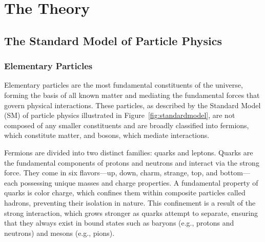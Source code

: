 \chapter{The Theory} \label{chap:chap-2}




    



\section{The Standard Model of Particle Physics}


\subsection{Elementary Particles}

Elementary particles are the most fundamental constituents of the universe, forming the basis of all known matter and mediating the fundamental forces that govern physical interactions. These particles, as described by the Standard Model (SM) of particle physics illustrated in Figure~\ref{fig:standardmodel}, are not composed of any smaller constituents and are broadly classified into fermions, which constitute matter, and bosons, which mediate interactions. 

Fermions are divided into two distinct families: quarks and leptons. Quarks are the fundamental components of protons and neutrons and interact via the strong force. They come in six flavors—up, down, charm, strange, top, and bottom—each possessing unique masses and charge properties. A fundamental property of quarks is color charge, which confines them within composite particles called hadrons, preventing their isolation in nature. This confinement is a result of the strong interaction, which grows stronger as quarks attempt to separate, ensuring that they always exist in bound states such as baryons (e.g., protons and neutrons) and mesons (e.g., pions).  

